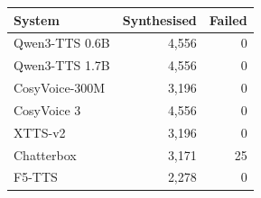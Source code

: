 \begin{tabular}{lrr}
\toprule
\textbf{System} & \textbf{Synthesised} & \textbf{Failed} \\
\midrule
Qwen3-TTS 0.6B & 4,556 & 0 \\
Qwen3-TTS 1.7B & 4,556 & 0 \\
CosyVoice-300M & 3,196 & 0 \\
CosyVoice 3 & 4,556 & 0 \\
XTTS-v2 & 3,196 & 0 \\
Chatterbox & 3,171 & 25 \\
F5-TTS & 2,278 & 0 \\
\bottomrule
\end{tabular}

